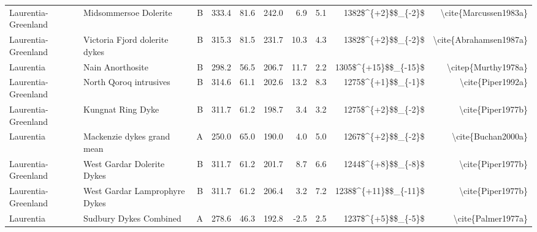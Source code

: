 \begin{longtable}{p{1 in}p{1 in}rrrrrrrr}
           Laurentia-Greenland &                            Midsommersoe Dolerite &      B &     333.4 &      81.6 & 242.0 &   6.9 &       5.1 &     1382\$\textasciicircum \{+2\}\$\$\_\{-2\}\$ &                              \textbackslash cite\{Marcussen1983a\} \\
           Laurentia-Greenland &                    Victoria Fjord dolerite dykes &      B &     315.3 &      81.5 & 231.7 &  10.3 &       4.3 &     1382\$\textasciicircum \{+2\}\$\$\_\{-2\}\$ &                             \textbackslash cite\{Abrahamsen1987a\} \\
                     Laurentia &                                 Nain Anorthosite &      B &     298.2 &      56.5 & 206.7 &  11.7 &       2.2 &   1305\$\textasciicircum \{+15\}\$\$\_\{-15\}\$ &                                \textbackslash citep\{Murthy1978a\} \\
           Laurentia-Greenland &                           North Qoroq intrusives &      B &     314.6 &      61.1 & 202.6 &  13.2 &       8.3 &     1275\$\textasciicircum \{+1\}\$\$\_\{-1\}\$ &                                  \textbackslash cite\{Piper1992a\} \\
           Laurentia-Greenland &                                Kungnat Ring Dyke &      B &     311.7 &      61.2 & 198.7 &   3.4 &       3.2 &     1275\$\textasciicircum \{+2\}\$\$\_\{-2\}\$ &                                  \textbackslash cite\{Piper1977b\} \\
                     Laurentia &                       Mackenzie dykes grand mean &      A &     250.0 &      65.0 & 190.0 &   4.0 &       5.0 &     1267\$\textasciicircum \{+2\}\$\$\_\{-2\}\$ &                                 \textbackslash cite\{Buchan2000a\} \\
           Laurentia-Greenland &                       West Gardar Dolerite Dykes &      B &     311.7 &      61.2 & 201.7 &   8.7 &       6.6 &     1244\$\textasciicircum \{+8\}\$\$\_\{-8\}\$ &                                  \textbackslash cite\{Piper1977b\} \\
           Laurentia-Greenland &                    West Gardar Lamprophyre Dykes &      B &     311.7 &      61.2 & 206.4 &   3.2 &       7.2 &   1238\$\textasciicircum \{+11\}\$\$\_\{-11\}\$ &                                  \textbackslash cite\{Piper1977b\} \\
                     Laurentia &                           Sudbury Dykes Combined &      A &     278.6 &      46.3 & 192.8 &  -2.5 &       2.5 &     1237\$\textasciicircum \{+5\}\$\$\_\{-5\}\$ &                                 \textbackslash cite\{Palmer1977a\} \\

\end{longtable}
